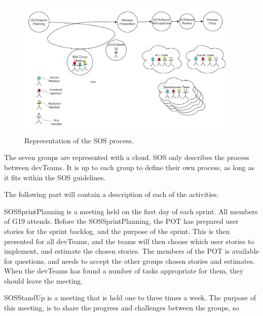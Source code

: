 \begin{figure}[h]
    \begin{center}
        \includegraphics[width=0.95\textwidth]{figures/SOSProcess}
    \end{center}
    \caption{Representation of the \gls{SOS} process.}
    \label{fig:SOSProcess}
\end{figure}

The seven groups are represented with a cloud. \gls{SOS} only describes the process between \glspl{devTeam}. It is up to each group to define their own process, as long as it fits within the \gls{SOS} guidelines. 

The following part will contain a description of each of the activities.

\Gls{SOSSprintPlanning} is a meeting held on the first day of each sprint. All members of \Gls{G19} attends. Before the \Gls{SOSSprintPlanning}, the \gls{POT} has prepared user stories for the sprint backlog, and the purpose of the sprint. 
This is then presented for all \glspl{devTeam}, and the teams will then choose which user stories to implement, and estimate the chosen stories. 
The members of the \gls{POT} is available for questions, and needs to accept the other groups chosen stories and estimates. 
When the \glspl{devTeam} has found a number of tasks appropriate for them, they should leave the meeting. 
 
\Gls{SOSStandUp} is a meeting that is held one to three times a week. The purpose of this meeting, is to share the progress and challenges between the groups, so 